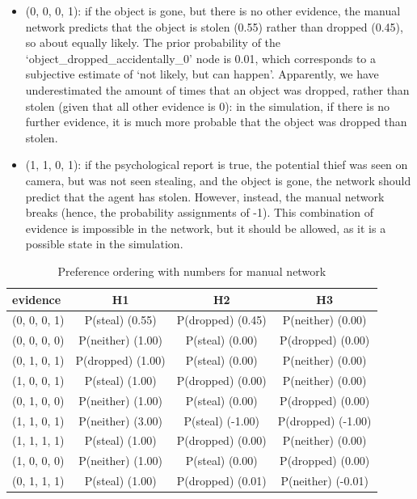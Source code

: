 \documentclass[12pt]{article}
\begin{document}
\begin{itemize}
\item (0, 0, 0, 1): if the object is gone, but there is no other evidence, the manual network predicts that the object is stolen (0.55) rather than dropped (0.45), so about equally likely. The prior probability of the `object\_dropped\_accidentally\_0' node is 0.01, which corresponds to a subjective estimate of `not likely, but can happen'. Apparently, we have underestimated the amount of times that an object was dropped, rather than stolen (given that all other evidence is 0): in the simulation, if there is no further evidence, it is much more probable that the object was dropped than stolen.
\item (1, 1, 0, 1): if the psychological report is true, the potential thief was seen on camera, but was not seen stealing, and the object is gone, the network should predict that the agent has stolen. However, instead, the manual network breaks (hence, the probability assignments of -1). This combination of evidence is impossible in the network, but it should be allowed, as it is a possible state in the simulation.
\end{itemize}



\begin{table}
\centering
\small
\begin{tabular}{|l|c|c|c|}
\hline
evidence & H1 & H2 & H3 \\
\hline
(0, 0, 0, 1)&P(steal) (0.55) & P(dropped) (0.45) & P(neither) (0.00) \\
(0, 0, 0, 0)&P(neither) (1.00) & P(steal) (0.00) & P(dropped) (0.00) \\
(0, 1, 0, 1)&P(dropped) (1.00) & P(steal) (0.00) & P(neither) (0.00) \\
(1, 0, 0, 1)&P(steal) (1.00) & P(dropped) (0.00) & P(neither) (0.00) \\
(0, 1, 0, 0)&P(neither) (1.00) & P(steal) (0.00) & P(dropped) (0.00) \\
(1, 1, 0, 1)&P(neither) (3.00) & P(steal) (-1.00) & P(dropped) (-1.00) \\
(1, 1, 1, 1)&P(steal) (1.00) & P(dropped) (0.00) & P(neither) (0.00) \\
(1, 0, 0, 0)&P(neither) (1.00) & P(steal) (0.00) & P(dropped) (0.00) \\
(0, 1, 1, 1)&P(steal) (1.00) & P(dropped) (0.01) & P(neither) (-0.01) \\
\hline
\end{tabular}
\caption{ Preference ordering with numbers for manual network}
\label{wife}
\end{table}%
\end{document}
